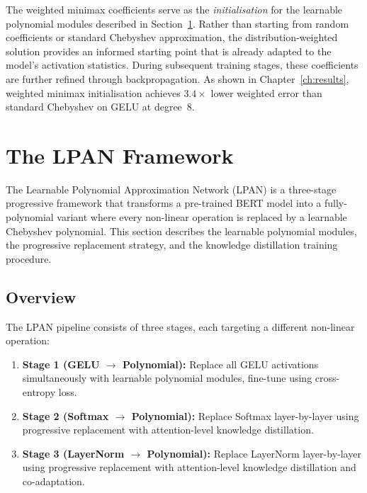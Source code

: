 The weighted minimax coefficients serve as the \emph{initialisation} for the learnable polynomial modules described in Section~\ref{sec:lpan}. Rather than starting from random coefficients or standard Chebyshev approximation, the distribution-weighted solution provides an informed starting point that is already adapted to the model's activation statistics. During subsequent training stages, these coefficients are further refined through backpropagation. As shown in Chapter~\ref{ch:results}, weighted minimax initialisation achieves $3.4\times$ lower weighted error than standard Chebyshev on GELU at degree~8.



\section{The LPAN Framework}
\label{sec:lpan}
\label{sec:lpan_framework}
\label{sec:lpan_three_stage}

The Learnable Polynomial Approximation Network (LPAN) is a three-stage progressive framework that transforms a pre-trained BERT model into a fully-polynomial variant where every non-linear operation is replaced by a learnable Chebyshev polynomial. This section describes the learnable polynomial modules, the progressive replacement strategy, and the knowledge distillation training procedure.

\subsection{Overview}

The LPAN pipeline consists of three stages, each targeting a different non-linear operation:
\begin{enumerate}
    \item \textbf{Stage 1 (GELU $\to$ Polynomial):} Replace all GELU activations simultaneously with learnable polynomial modules, fine-tune using cross-entropy loss.
    \item \textbf{Stage 2 (Softmax $\to$ Polynomial):} Replace Softmax layer-by-layer using progressive replacement with attention-level knowledge distillation.
    \item \textbf{Stage 3 (LayerNorm $\to$ Polynomial):} Replace LayerNorm layer-by-layer using progressive replacement with attention-level knowledge distillation and co-adaptation.
\end{enumerate}

